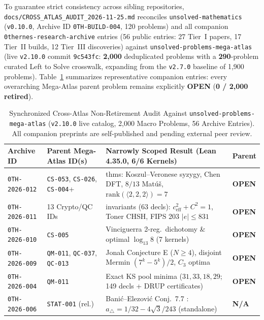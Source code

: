 \documentclass[11pt,reqno]{amsart}
\theoremstyle{plain}
\theoremstyle{definition}
\newcommand{\code}[1]{{\upshape\nolinkurl{#1}}}
\begin{document}
To guarantee strict consistency across sibling repositories, \code{docs/CROSS_ATLAS_AUDIT_2026-11-25.md}
reconciles \code{unsolved-mathematics} (\texttt{v0.10.0}, Archive ID \code{0TH-BUILD-004}, 120 problems)
and all companion \code{0thernes-research-archive} entries (56 public entries: 27 Tier~I papers,
17 Tier~II builds, 12 Tier~III discoveries) against \code{unsolved-problems-mega-atlas}
(live \texttt{v2.10.0} commit \texttt{9c543fc}: \textbf{2,000} deduplicated problems with a
\textbf{290}-problem curated Left to Solve crosswalk, expanding from the \texttt{v2.7.0} baseline
of 1,900 problems). Table~\ref{tab:crossatlas} summarizes representative companion entries: every
overarching Mega-Atlas parent problem remains explicitly \textbf{OPEN}
(\textbf{0 / 2,000 retired}).

\begin{table}[htbp]
\centering
\caption{Synchronized Cross-Atlas Non-Retirement Audit Against \code{unsolved-problems-mega-atlas}
(\texttt{v2.10.0} live catalog, 2,000 Macro Problems, 56 Archive Entries). All companion
preprints are self-published and pending external peer review.}
\label{tab:crossatlas}
\scriptsize
\begin{tabularx}{\textwidth}{@{}ll>{\raggedright\arraybackslash}Xl@{}}
\toprule
Archive ID & Parent Mega-Atlas ID(s) & Narrowly Scoped Result (Lean 4.35.0, 6/6 Kernels) & Parent \\
\midrule
\code{0TH-2026-012} & \code{CS-053}, \code{CS-026}, \code{CS-004}+ & 27 thms: Koszul--Veronese syzygy, Chen DFT, $8/13$ Mat\'u\v{s}, $\mathrm{rank}(\langle 2,2,2\rangle)=7$ & \textbf{OPEN} \\
\code{0TH-2026-011} & 13 Crypto/QC IDs & 28 invariants (63 decls): $c_{\mathrm{eff}}^2+C^2=1$, Toner CHSH, FIPS 203 $|e|\le 831$ & \textbf{OPEN} \\
\code{0TH-2026-010} & \code{CS-005} & Vinciguerra \cite{vinciguerra2026catalytic} 2-reg.\ dichotomy \& optimal $\log_{13} 8$ (7 kernels) & \textbf{OPEN} \\
\code{0TH-2026-009} & \code{QM-011}, \code{QC-037}, \code{QC-013} & Jonah Conjecture E ($N\ge 4$), disjoint Mermin $(7^k-5^k)/2$, $C_3$ optima & \textbf{OPEN} \\
\code{0TH-2026-004} & \code{QM-011} & Exact KS pool minima ($31, 33, 18, 29$; 149 decls + DRUP certificates) & \textbf{OPEN} \\
\code{0TH-2026-006} & \code{STAT-001} (rel.) & Bani\'c--Elezovi\'c Conj.\ 7.7 \cite{banic2026multinomial}: $a_\triangle = 1/32 - 4\sqrt{3}/243$ (standalone) & \textbf{N/A} \\

\end{tabularx}
\end{table}
\end{document}
